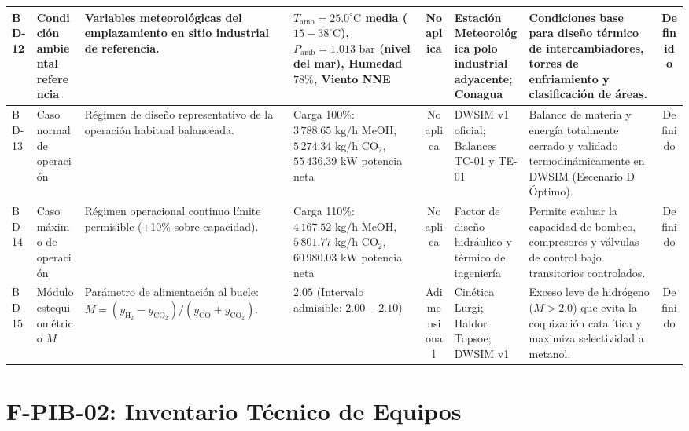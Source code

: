 \documentclass[10pt,letterpaper]{article}
\begin{document}
\begin{landscape}
\begin{xltabular}{\linewidth}{|l|p{2.8cm}|p{3.5cm}|p{3.0cm}|c|p{3.2cm}|>{\raggedright\arraybackslash}X|c|}
BD-12 & Condición ambiental referencia & Variables meteorológicas del emplazamiento en sitio industrial de referencia. & $T_{\text{amb}} = 25.0^\circ\text{C}$ media ($15-38^\circ\text{C}$), $P_{\text{amb}} = 1.013\text{ bar}$ (nivel del mar), Humedad $78\%$, Viento NNE & No aplica & Estación Meteorológica polo industrial adyacente; Conagua & Condiciones base para diseño térmico de intercambiadores, torres de enfriamiento y clasificación de áreas. & Definido \\ \hline
BD-13 & Caso normal de operación & Régimen de diseño representativo de la operación habitual balanceada. & Carga 100\%: $3\,788.65\text{ kg/h}$ MeOH, $5\,274.34\text{ kg/h}$ $\text{CO}_2$, $55\,436.39\text{ kW}$ potencia neta & No aplica & DWSIM v1 oficial; Balances TC-01 y TE-01 & Balance de materia y energía totalmente cerrado y validado termodinámicamente en DWSIM (Escenario D Óptimo). & Definido \\ \hline
BD-14 & Caso máximo de operación & Régimen operacional continuo límite permisible (+10\% sobre capacidad). & Carga 110\%: $4\,167.52\text{ kg/h}$ MeOH, $5\,801.77\text{ kg/h}$ $\text{CO}_2$, $60\,980.03\text{ kW}$ potencia neta & No aplica & Factor de diseño hidráulico y térmico de ingeniería & Permite evaluar la capacidad de bombeo, compresores y válvulas de control bajo transitorios controlados. & Definido \\ \hline
BD-15 & Módulo estequiométrico $M$ & Parámetro de alimentación al bucle: $M = (y_{\text{H}_2} - y_{\text{CO}_2})/(y_{\text{CO}} + y_{\text{CO}_2})$. & $2.05$ (Intervalo admisible: $2.00 - 2.10$) & Adimensional & Cinética Lurgi; Haldor Topsoe; DWSIM v1 & Exceso leve de hidrógeno ($M > 2.0$) que evita la coquización catalítica y maximiza selectividad a metanol. & Definido \\ \hline
\end{xltabular}
\end{landscape}

\newpage
\section{F-PIB-02: Inventario Técnico de Equipos}
\end{document}
